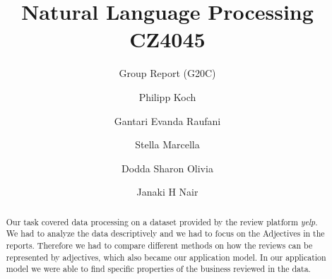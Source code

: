 \documentclass[sigchi]{acmart}
\begin{document}
	
	\title{Natural Language Processing CZ4045}
	\subtitle{Group Report (G20C)}
	
	\author{Philipp Koch}
	
	\author{Gantari Evanda Raufani}
	
	\author{Stella Marcella}
	
	\author{Dodda Sharon Olivia}
	
	\author{Janaki H Nair}
	
	
	\begin{abstract}
		Our task covered data processing on a dataset provided by the review platform \textit{yelp}. We had to analyze the data
		descriptively and we had to focus on the Adjectives in the reports. Therefore we had to compare different methods on how the reviews can be represented by adjectives, which also became our application model. In our application model we were able to find specific properties of the business reviewed in the data.
	\end{abstract}
	
\end{document}

